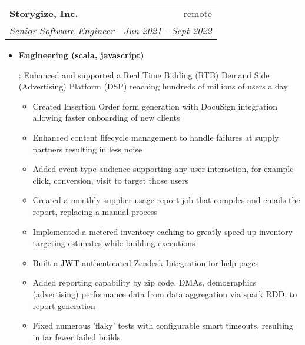 \documentclass[letterpaper,10pt]{article}
\makeatletter
\newcommand{\resumeItem}[2]{
  \item\small{
    \textbf{#1}{: #2 \vspace{-2pt}}
  }
}
\newcommand{\resumeSubheading}[4]{
  \vspace{-1pt}\item[]
  \begin{tabular*}{0.98\textwidth}{l@{\extracolsep{\fill}}r}
      \hspace{-10pt}\textbf{#1} & #2 \\
      \hspace{-10pt}\textit{\small#3} & \textit{\small #4} \\
    \end{tabular*}\vspace{-5pt}
}
\newcommand{\resumeItemListStart}{\begin{itemize}}
\newcommand{\resumeItemListEnd}{\end{itemize}\vspace{-5pt}}
\makeatother
\begin{document}
    \resumeSubheading
      {Storygize, Inc.}{remote}
      {Senior Software Engineer}{Jun 2021 - Sept 2022}
      \resumeItemListStart
        \resumeItem{Engineering (scala, javascript)}
          {Enhanced and supported a Real Time Bidding (RTB) Demand Side (Advertising) Platform (DSP) reaching hundreds of millions of users a day
            \begin{itemize}
                \item Created Insertion Order form generation with DocuSign integration allowing faster onboarding of new clients
                \item Enhanced content lifecycle management to handle failures at supply partners resulting in less noise
                \item Added event type audience supporting any user interaction, for example click, conversion, visit to target those users
                \item Created a monthly supplier usage report job that compiles and emails the report, replacing a manual process
                \item Implemented a metered inventory caching to greatly speed up inventory targeting estimates while building executions
                \item Built a JWT authenticated Zendesk Integration for help pages
                \item Added reporting capability by zip code, DMAs, demographics (advertising) performance data from data aggregation via spark RDD, to report generation
                \item Fixed numerous 'flaky' tests with configurable smart timeouts, resulting in far fewer failed builds
            \end{itemize}
            }
      \resumeItemListEnd
\end{document}
